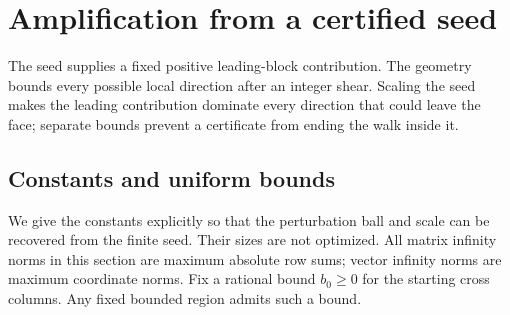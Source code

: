 \section{Amplification from a certified seed}\label{sec:amplification}
The seed supplies a fixed positive leading-block contribution. The geometry bounds every possible local direction after an integer shear. Scaling the seed makes the leading contribution dominate every direction that could leave the face; separate bounds prevent a certificate from ending the walk inside it.

\subsection{Constants and uniform bounds}
We give the constants explicitly so that the perturbation ball and scale can be recovered from the finite seed. Their sizes are not optimized. All matrix infinity norms in this section are maximum absolute row sums; vector infinity norms are maximum coordinate norms. Fix a rational bound $b_0\ge0$ for the starting cross columns. Any fixed bounded region admits such a bound.

